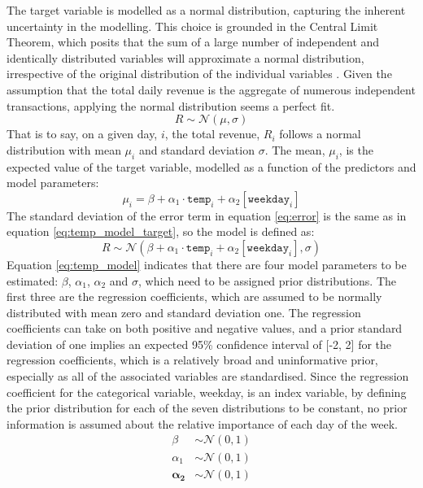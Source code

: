 The target variable is modelled as a normal distribution, capturing the
inherent uncertainty in the modelling. This choice is grounded in the Central
Limit Theorem, which posits that the sum of a large number of independent and
identically distributed variables will approximate a normal distribution,
irrespective of the original distribution of the individual variables
\cite{clt1} \cite{clt2}. Given the assumption that the total daily revenue is
the aggregate of numerous independent transactions, applying the
normal distribution seems a perfect fit.
\begin{equation}
  \label{eq:temp_model_target}
  R \sim \mathcal{N}(\mu, \sigma)
\end{equation}
That is to say, on a given day, $i$, the total revenue, $R_i$ follows a normal
distribution with mean $\mu_i$ and standard deviation $\sigma$. The mean,
$\mu_i$, is the expected value of the target variable, modelled as a function
of the predictors and model parameters:
\begin{equation}
  \mu_i = \beta + \alpha_1 \cdot \texttt{temp}_i + \alpha_2[\texttt{weekday}_i]
\end{equation}
The standard deviation of the error term in equation \ref{eq:error} is 
the same as in equation \ref{eq:temp_model_target}, so the model is defined as: 
\begin{equation}
  \label{eq:temp_model}
  R \sim \mathcal{N}(\beta + \alpha_1 \cdot \texttt{temp}_i + \alpha_2[\texttt{weekday}_i], \sigma)
\end{equation}
Equation \ref{eq:temp_model} indicates that there are four model parameters to
be estimated: $\beta$, $\alpha_1$, $\alpha_2$ and $\sigma$, which need to be
assigned prior distributions. The first three are the regression coefficients,
which are assumed to be normally distributed with mean zero and standard
deviation one. The regression coefficients can take on both positive and
negative values, and a prior standard deviation of one implies an expected 95\%
confidence interval of [-2, 2] for the regression coefficients, which is a
relatively broad and uninformative prior, especially as all of the associated
variables are standardised. Since the regression coefficient for the
categorical variable, weekday, is an index variable, by defining the prior
distribution for each of the seven distributions to be constant, no prior
information is assumed about the relative importance of each day of the week.
\begin{equation}
  \label{eq:simple_temp_priors}
  \begin{split}
    \beta &\sim \mathcal{N}(0, 1) \\
    \alpha_1 &\sim \mathcal{N}(0, 1) \\
    \boldsymbol{\alpha_2} &\sim \mathcal{N}(0, 1) \\
  \end{split}
\end{equation}
